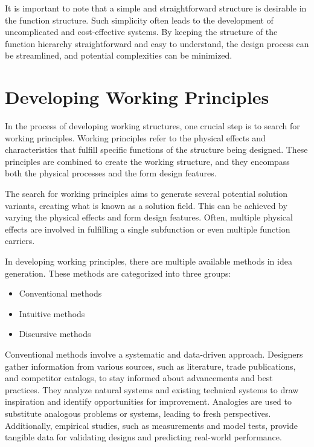 It is important to note that a simple and straightforward structure is desirable in the function structure. Such simplicity often leads to the development of uncomplicated and cost-effective systems. By keeping the structure of the function hierarchy straightforward and easy to understand, the design process can be streamlined, and potential complexities can be minimized.

\section{Developing Working Principles}

In the process of developing working structures, one crucial step is to search for working principles. Working principles refer to the physical effects and characteristics that fulfill specific functions of the structure being designed. These principles are combined to create the working structure, and they encompass both the physical processes and the form design features.

The search for working principles aims to generate several potential solution variants, creating what is known as a solution field. This can be achieved by varying the physical effects and form design features. Often, multiple physical effects are involved in fulfilling a single subfunction or even multiple function carriers. \cite{Pahl07f}

In developing working principles, there are multiple available methods in idea generation. These methods are categorized into three groups:

\begin{itemize}
    \item Conventional methods
    \item Intuitive methods
    \item Discursive methods
\end{itemize}

Conventional methods involve a systematic and data-driven approach. Designers gather information from various sources, such as literature, trade publications, and competitor catalogs, to stay informed about advancements and best practices. They analyze natural systems and existing technical systems to draw inspiration and identify opportunities for improvement. Analogies are used to substitute analogous problems or systems, leading to fresh perspectives. Additionally, empirical studies, such as measurements and model tests, provide tangible data for validating designs and predicting real-world performance. \cite{Pahl07g}

